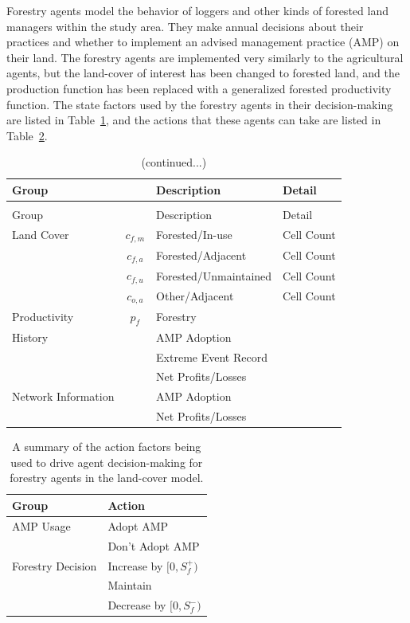 Forestry agents model the behavior of loggers and other kinds of
forested land managers within the study area.
They make annual decisions about their practices
and whether to implement an advised management practice (AMP)
on their land.
The forestry agents are implemented very similarly to the
agricultural agents, but the land-cover of interest has been changed
to forested land, and the production function has been replaced with
a generalized forested productivity function.
The state factors used by the forestry agents in their decision-making
are listed in Table~\ref{tab:land_forest_state},
and the actions that these agents can take are listed
in Table~\ref{tab:land_forest_act}.

\begin{longtable}{lcll}
\caption{A summary of the state factors being used during decision-making
for forestry agents in the land-cover model.} 
\label{tab:land_forest_state}
\\
\hline\hline
Group && Description & Detail \\
\hline
\endfirsthead
\caption[]{(continued...)}
\\
\hline\hline
Group && Description & Detail \\
\hline
\endhead
\hline
\endfoot
Land Cover &$c_{f,m}$& Forested/In-use & Cell Count \\
&$c_{f,a}$& Forested/Adjacent & Cell Count \\
&$c_{f,u}$& Forested/Unmaintained & Cell Count \\
&$c_{o,a}$& Other/Adjacent & Cell Count \\
Productivity &$p_f$& Forestry & \\
History && AMP Adoption & \\
 && Extreme Event Record & \\
 && Net Profits/Losses & \\
Network Information && AMP Adoption & \\
 && Net Profits/Losses \\
\end{longtable}

\begin{longtable}{lp{}}
\caption{A summary of the action factors being used to drive agent
    decision-making for forestry agents in the land-cover model.}
\label{tab:land_forest_act} \\
\hline\hline
Group & Action   \\
\hline\endfirsthead
\hline\endfoot
AMP Usage & Adopt AMP  \\
    & Don't Adopt AMP  \\
Forestry Decision & Increase by $[0, S^+_f)$  \\
    & Maintain  \\
    & Decrease by $[0, S^-_f)$  \\
\end{longtable}

